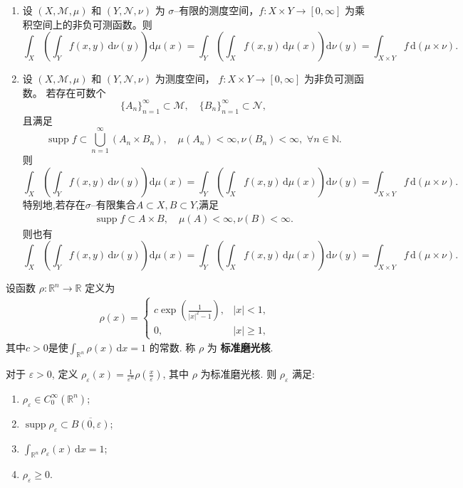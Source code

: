 \documentclass[../../main.tex]{subfiles}%
\begin{document}
\begin{theorem}[Tonelli定理]
\label{theorem:Tonelli定理}
\begin{enumerate}[(1)]
\item 设 $(X,\mathscr{M},\mu)$ 和 $(Y,\mathscr{N},\nu)$ 为 $\sigma$--有限的测度空间，$f: X \times Y \to [0,\infty]$ 为乘积空间上的非负可测函数。则
\[
\int_X \left( \int_Y f(x,y)\,\mathrm{d}\nu(y) \right) \mathrm{d}\mu(x)
=
\int_Y \left( \int_X f(x,y)\,\mathrm{d}\mu(x) \right) \mathrm{d}\nu(y)
=
\int_{X\times Y} f\,\mathrm{d}(\mu\times\nu).
\]

\item 设 $(X,\mathscr{M},\mu)$ 和 $(Y,\mathscr{N},\nu)$  为测度空间，
$f:X\times Y\to[0,\infty]$ 为非负可测函数。
若存在可数个
$$
\{A_n\}_{n=1}^{\infty}\subset \mathscr{M},\quad \{B_n\}_{n=1}^{\infty}\subset \mathscr{N},
$$
且满足
\[
\operatorname{supp} f \subset \bigcup_{n=1}^{\infty} (A_n\times B_n),\quad \mu(A_n)<\infty,\nu(B_n)<\infty,\,\, \forall n\in \mathbb{N}.
\]
则
\[
\int_X \left(\int_Y f(x,y)\,\mathrm{d}\nu(y)\right)\mathrm{d}\mu(x)
=
\int_Y \left(\int_X f(x,y)\,\mathrm{d}\mu(x)\right)\mathrm{d}\nu(y)
=
\int_{X\times Y} f\,\mathrm{d}(\mu\times\nu).
\]
特别地,若存在$\sigma$--有限集合$A\subset X,B\subset Y$,满足
\begin{align*}
\operatorname{supp} f \subset A\times B,\quad \mu(A)<\infty ,\nu(B)<\infty.
\end{align*}
则也有
\[
\int_X \left(\int_Y f(x,y)\,\mathrm{d}\nu(y)\right)\mathrm{d}\mu(x)
=
\int_Y \left(\int_X f(x,y)\,\mathrm{d}\mu(x)\right)\mathrm{d}\nu(y)
=
\int_{X\times Y} f\,\mathrm{d}(\mu\times\nu).
\]
\end{enumerate}
\end{theorem}

\begin{definition}\label{definition:标准磨光核}
设函数 $\rho:\mathbb{R}^n\to\mathbb{R}$ 定义为
\begin{align*}
\rho(x)=
\begin{cases}
c\exp\left(\frac{1}{|x|^2-1}\right), & |x|<1,\\
0, & |x|\geqslant 1,
\end{cases}
\end{align*}
其中$c>0$是使$\int_{\mathbb{R}^n}\rho(x)\,\mathrm{d}x=1$ 的常数. 称 $\rho$ 为 \textbf{标准磨光核}.
\end{definition}

\begin{theorem}[标准磨光核的基本性质]\label{theorem:标准磨光核的基本性质}
对于 $\varepsilon>0$, 定义 $\rho_\varepsilon(x)=\frac{1}{\varepsilon^n}\rho\left(\frac{x}{\varepsilon}\right)$, 其中 $\rho$ 为标准磨光核. 则 $\rho_\varepsilon$ 满足:
\begin{enumerate}[(1)]
\item $\rho_\varepsilon\in C_0^\infty(\mathbb{R}^n)$;
\item $\operatorname{supp}\rho_\varepsilon\subset \overline{B(0,\varepsilon)}$;
\item $\int_{\mathbb{R}^n}\rho_\varepsilon(x)\,\mathrm{d}x=1$;
\item $\rho_\varepsilon\geqslant 0$.
\end{enumerate}
\end{theorem}
\end{document}
